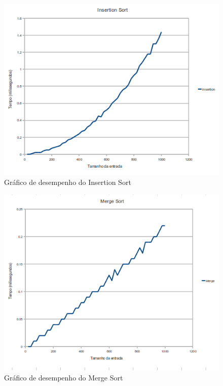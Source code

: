 \documentclass[10pt,a4paper]{article}
\begin{document}
\begin{figure}[ht]
\centering
\includegraphics[width=1.2\textwidth]{insertion.png}
\caption{Gráfico de desempenho do Insertion Sort}
\label{fig:insertion}
\end{figure}


\begin{figure}[ht]
\centering
\includegraphics[width=1.2\textwidth]{merge.png}
\caption{Gráfico de desempenho do Merge Sort}
\label{fig:merge}
\end{figure}
\end{document}
